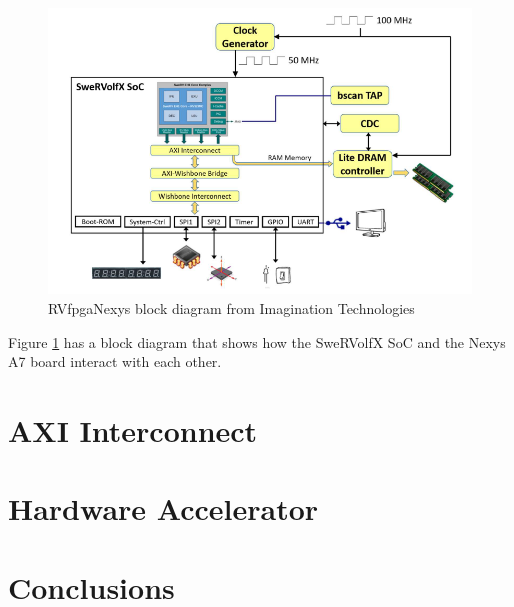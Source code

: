\begin{figure}[H]
    \centering
    \includegraphics[scale=0.7]{Figures/RVfpgaNexys.png}
    \caption{RVfpgaNexys block diagram from Imagination Technologies}
    \label{fig:RVfpgaNexys}
\end{figure}

Figure \ref{fig:RVfpgaNexys} has a block diagram that shows how the SweRVolfX SoC and the Nexys A7 board interact with each other.



\section{AXI Interconnect}


\section{Hardware Accelerator}


\section{Conclusions}